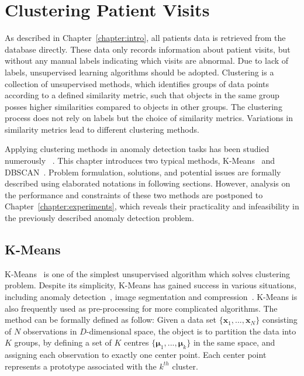 \chapter{Clustering Patient Visits}
\label{chapter:clustering}

As described in Chapter~\ref{chapter:intro}, all patients data is retrieved from the database directly. These data only records information about patient visits, but without any manual labels indicating which visits are abnormal. Due to lack of labels, unsupervised learning algorithms should be adopted. Clustering is a collection of unsupervised methods, which identifies groups of data points according to a defined similarity metric, such that objects in the same group posses higher similarities compared to objects in other groups. The clustering process does not rely on labels but the choice of similarity metrics. Variations in similarity metrics lead to different clustering methods.

Applying clustering methods in anomaly detection tasks has been studied numerously~\cite{he2003discovering}
. This chapter introduces two typical methods, K-Means~\cite{lloyd1982least} and DBSCAN~\cite{ester1996density}. Problem formulation, solutions, and potential issues are formally described using elaborated notations in following sections. However, analysis on the performance and constraints of these two methods are postponed to Chapter~\ref{chapter:experiments}, which reveals their practicality and infeasibility in the previously described anomaly detection problem.

\section{K-Means}
\label{sec:k-means}

K-Means~\cite{lloyd1982least} is one of the simplest unsupervised algorithm which solves clustering problem. Despite its simplicity, K-Means has gained success in various situations, including anomaly detection~\cite{campello2015hierarchical}\cite{he2003discovering}, image segmentation and compression~\cite{forsyth2002computer}. K-Means is also frequently used as pre-processing for more complicated algorithms. The method can be formally defined as follow: Given a data set $\{\mathbf{x}_1, ... , \mathbf{x}_N\}$ consisting of $N$ observations in $D$-dimensional space, the object is to partition the data into $K$ groups, by defining a set of $K$ centres $\{\boldsymbol{\mu}_1, ... , \boldsymbol{\mu}_k\}$ in the same space, and assigning each observation to exactly one center point. Each center point represents a prototype associated with the $k^{th}$ cluster.

